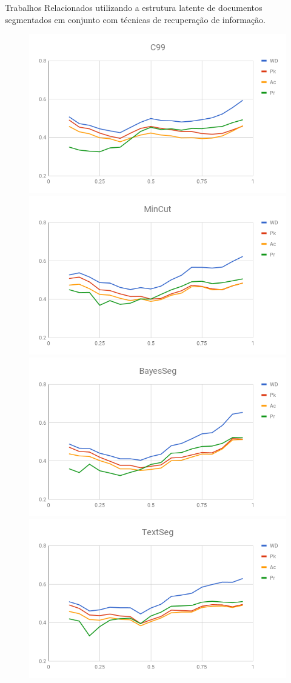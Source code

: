 \begin{frame}{Trabalhos Relacionados}
utilizando a estrutura latente de documentos segmentados em conjunto com técnicas de recuperação de informação.











\begin{figure}[!h] \centering     %

	  \includegraphics[width=.48\textwidth]{images/graficos/analiseNSegRate-C99.png}
	  \includegraphics[width=.48\textwidth]{images/graficos/analiseNSegRate-MinCut.png}
	  \includegraphics[width=.48\textwidth]{images/graficos/analiseNSegRate-Bayes.png}
	  \includegraphics[width=.48\textwidth]{images/graficos/analiseNSegRate-UISeg.png}
	\label{fig:influencia-SegRate}
\end{figure}






\end{frame}
